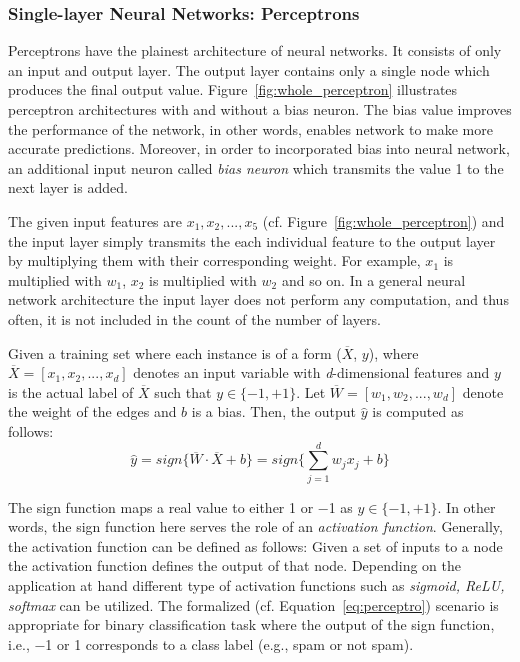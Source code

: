 \subsubsection{Single-layer Neural Networks: Perceptrons}

Perceptrons have the plainest architecture of neural networks. It consists of only an input and output layer. The output layer contains only a single node which produces the final output value. Figure~\ref{fig:whole_perceptron} illustrates  perceptron architectures with and without a bias neuron. The bias value improves the performance of the network, in other words, enables network to make more accurate predictions. Moreover, in order to incorporated bias into neural network, an additional input neuron called \textit{bias neuron} which transmits the value 1 to the next layer is added. 

The given input features are $x_1, x_2, ..., x_5$ (cf. Figure~\ref{fig:whole_perceptron}) and the input layer simply transmits the each individual feature to the output layer by multiplying them with their corresponding weight. For example, $x_1$ is multiplied with $w_1$, $x_2$ is multiplied with $w_2$ and so on. In a general neural network architecture the input layer does not perform any computation, and thus often, it is not included in the count of the number of layers.

Given a training set where each instance is of a form ($\overline{X}$, $y$), where $\overline{X}=[x_1,x_2,...,x_d]$ denotes an input variable with \textit{d}-dimensional features and $y$ is the actual label of  $\overline{X}$ such that $y \in{\{-1, +1\}}$. Let $\overline{W}=[w_1,w_2,...,w_d]$ denote the weight of the edges and $b$ is a bias. Then, the output $\hat{y}$ is computed as follows: \begin{equation} \label{eq:perceptro}
\hat{y}=sign\{ \overline{W}\cdot \overline{X}+b\} = sign\{ \sum\limits_{j=1}^{d} w_jx_j+b\}
\end{equation}


The sign function maps a real value to either \num{+1} or \num{-1} as $y \in{\{-1, +1\}}$. In other words, the sign function here serves the role of an \textit{activation function}. Generally, the activation function can be defined as follows: Given a set of inputs to a node the activation function defines the output of that node. Depending on the application at hand different type of activation functions such as \textit{sigmoid, ReLU, softmax} can be utilized. The formalized (cf. Equation~\ref{eq:perceptro}) scenario is appropriate for binary classification task where the output of the sign function, i.e., \num{-1} or \num{+1} corresponds to a class label (e.g., spam or not spam). 

